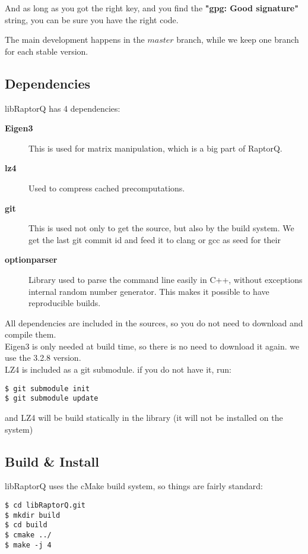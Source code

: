 \documentclass[11pt,a4paper]{refart}
\begin{document}
And as long as you got the right key, and you find the \textbf{"gpg: Good signature"} string,
you can be sure you have the right code.

The main development happens in the $master$ branch, while we keep one branch for each stable version.


\subsection{Dependencies}

libRaptorQ has 4 dependencies:
\begin{description}
\item[\textbf{Eigen3}] This is used for matrix manipulation, which is a big part of RaptorQ.
\item[\textbf{lz4}] Used to compress cached precomputations.
\item[\textbf{git}] This is used not only to get the source, but also by the build system. We get the last git commit id and feed it to clang or gcc as seed for their
\item[\textbf{optionparser}] Library used to parse the command line easily in C++, without exceptions
internal random number generator. This makes it possible to have reproducible builds.
\end{description}

All dependencies are included in the sources, so you do not need to download and compile them.\\
Eigen3 is only needed at build time, so there is no need to download it again. we use the 3.2.8 version.\\
LZ4 is included as a git submodule. if you do not have it, run:
\begin{verbatim}
$ git submodule init
$ git submodule update
\end{verbatim}
and LZ4 will be build statically in the library (it will not be installed on the system)

\subsection{Build \& Install}

libRaptorQ uses the cMake build system, so things are fairly standard:

\begin{verbatim}
$ cd libRaptorQ.git
$ mkdir build
$ cd build
$ cmake ../
$ make -j 4
\end{verbatim}
\end{document}
